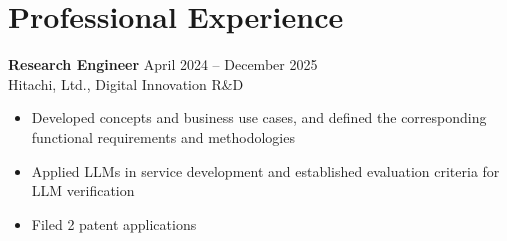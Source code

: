 \documentclass[letterpaper,10.5pt]{article}
\begin{document}
\section*{Professional Experience}
\textbf{Research Engineer} \hfill April 2024 -- December 2025 \\ 
Hitachi, Ltd., Digital Innovation R\&D \\ 
\vspace{-5pt}
\begin{itemize}[itemsep=0pt, parsep=0pt, topsep=0pt]
  \item Developed concepts and business use cases, and defined the corresponding functional requirements and methodologies
  \item Applied LLMs in service development and established evaluation criteria for LLM verification
  \item Filed 2 patent applications
\end{itemize}
\vspace{25pt}
\end{document}
